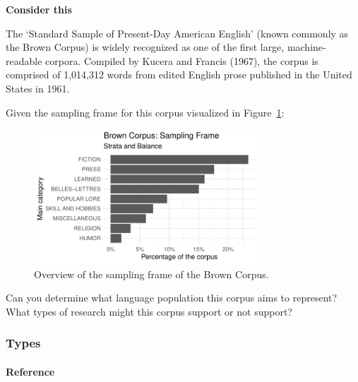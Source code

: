 \documentclass[
  letterpaper,
]{latex/krantz}
\let\oldparagraph\paragraph
\renewcommand{\paragraph}[1]{\oldparagraph{#1}\mbox{}}
\begin{document}
\begin{tcolorbox}[enhanced jigsaw, arc=.35mm, leftrule=.75mm, rightrule=.15mm, opacityback=0, colback=white, breakable, bottomrule=.15mm, left=2mm, toprule=.15mm]

\textbf{ Consider this}

The `Standard Sample of Present-Day American English' (known commonly as
the Brown Corpus) is widely recognized as one of the first large,
machine-readable corpora. Compiled by Kucera and Francis (1967), the
corpus is comprised of 1,014,312 words from edited English prose
published in the United States in 1961.

Given the sampling frame for this corpus visualized in
Figure~\ref{fig-brown-distribution}:

\begin{figure}[H]

{\centering \includegraphics[width=0.75\textwidth,height=\textheight]{understanding-data_files/figure-pdf/fig-brown-distribution-1.pdf}

}

\caption{\label{fig-brown-distribution}Overview of the sampling frame of
the Brown Corpus.}

\end{figure}

Can you determine what language population this corpus aims to
represent? What types of research might this corpus support or not
support?

\end{tcolorbox}

\hypertarget{types}{%
\subsubsection{Types}\label{types}}

\hypertarget{reference}{%
\paragraph{Reference}\label{reference}}
\end{document}
